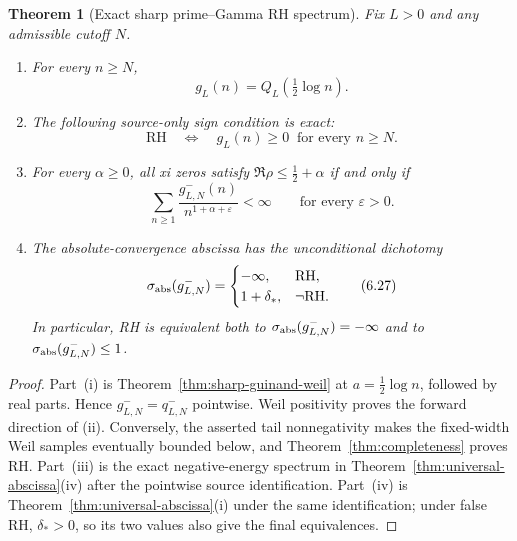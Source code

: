 \documentclass[11pt]{article}
\newtheorem{theorem}{Theorem}[section]
\begin{document}
\begin{theorem}[Exact sharp prime--Gamma RH spectrum]
\label{thm:prime-gamma-spectrum}
Fix $L>0$ and any admissible cutoff $N$.
\begin{enumerate}[label=\textup{(\roman*)}]
\item For every $n\ge N$,
\[
 g_L(n)=Q_L\!\left(\tfrac12\log n\right).
 \tag{6.24}
\]
\item The following source-only sign condition is exact:
\[
 \boxed{\quad\mathrm{RH}\quad\Longleftrightarrow\quad
 g_L(n)\ge0\ \text{ for every }n\ge N.\quad}
 \tag{6.25}
\]
\item For every $\alpha\ge0$, all xi zeros satisfy
$\Re\rho\le\frac12+\alpha$ if and only if
\[
 \sum_{n\ge1}\frac{g_{L,N}^-(n)}{n^{1+\alpha+\varepsilon}}<\infty
 \qquad\text{for every }\varepsilon>0.
 \tag{6.26}
\]
\item The absolute-convergence abscissa has the unconditional dichotomy
\[
 \sigma_{\rm abs}(g_{L,N}^-)=
 \begin{cases}
  -\infty,&\mathrm{RH},\\
  1+\delta_*,&\neg\mathrm{RH}.
 \end{cases}
 \tag{6.27}
\]
In particular, RH is equivalent both to
$\sigma_{\rm abs}(g_{L,N}^-)=-\infty$ and to
$\sigma_{\rm abs}(g_{L,N}^-)\le1$.
\end{enumerate}
\end{theorem}

\begin{proof}
Part~\textup{(i)} is Theorem~\ref{thm:sharp-guinand-weil} at
$a=\frac12\log n$, followed by real parts.  Hence $g_{L,N}^-=q_{L,N}^-$ pointwise.  Weil
positivity proves the forward direction of \textup{(ii)}.  Conversely, the asserted tail
nonnegativity makes the fixed-width Weil samples eventually bounded below, and
Theorem~\ref{thm:completeness} proves RH.  Part~\textup{(iii)} is the exact negative-energy
spectrum in Theorem~\ref{thm:universal-abscissa}\textup{(iv)} after the pointwise source
identification.  Part~\textup{(iv)} is
Theorem~\ref{thm:universal-abscissa}\textup{(i)} under the same identification; under false RH,
$\delta_*>0$, so its two values also give the final equivalences.
\end{proof}
\end{document}
